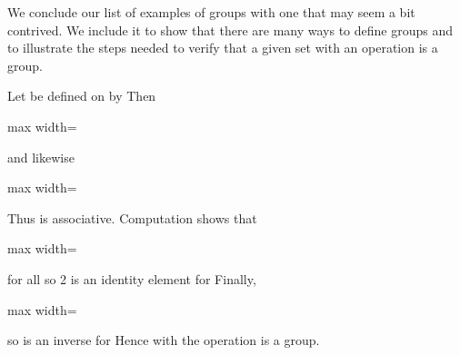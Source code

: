 \documentclass[11pt,oneside]{article}
\begin{document}
\BookNarrativetrue

\begin{BookBody}

We conclude our list of examples of groups with one that may seem a bit contrived. We include it to show that there are many ways to define groups and to illustrate the steps needed to verify that a given set with an operation is a group.

 Let \BookInline{\ast } be defined on  by  Then

\begin{center}\begin{adjustbox}{max width=\linewidth}\end{adjustbox}\end{center}

\noindent and likewise

\begin{center}\begin{adjustbox}{max width=\linewidth}\end{adjustbox}\end{center}

\noindent Thus \BookInline{\ast } is associative. Computation shows that

\begin{center}\begin{adjustbox}{max width=\linewidth}\end{adjustbox}\end{center}

\noindent for all  so 2 is an identity element for  Finally,

\begin{center}\begin{adjustbox}{max width=\linewidth}\end{adjustbox}\end{center}

\noindent so  is an inverse for  Hence  with the operation \BookInline{\ast } is a group. \BookEnd{\blacktriangle}


\end{BookBody}
\end{document}

